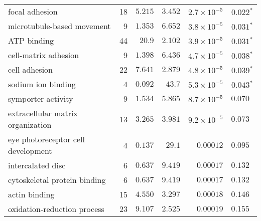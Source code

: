 \begin{longtable}{|l|r|r|r|r|r|}
                                    focal adhesion &                      18 &                $ 5.215$ &   $ 3.452$ &  $2.7\times 10^{-5}$ &              $\bm{ 0.022{^*}}$ \\
                        microtubule-based movement &                       9 &                $ 1.353$ &   $ 6.652$ &  $3.8\times 10^{-5}$ &              $\bm{ 0.031{^*}}$ \\
                                       ATP binding &                      44 &                $  20.9$ &   $ 2.102$ &  $3.9\times 10^{-5}$ &              $\bm{ 0.031{^*}}$ \\
                              cell-matrix adhesion &                       9 &                $ 1.398$ &   $ 6.436$ &  $4.7\times 10^{-5}$ &              $\bm{ 0.038{^*}}$ \\
                                     cell adhesion &                      22 &                $ 7.641$ &   $ 2.879$ &  $4.8\times 10^{-5}$ &              $\bm{ 0.039{^*}}$ \\
                                sodium ion binding &                       4 &                $ 0.092$ &   $  43.7$ &  $5.3\times 10^{-5}$ &              $\bm{ 0.043{^*}}$ \\
                                symporter activity &                       9 &                $ 1.534$ &   $ 5.865$ &  $8.7\times 10^{-5}$ &                     $ 0.070~~$ \\
                 extracellular matrix organization &                      13 &                $ 3.265$ &   $ 3.981$ &  $9.2\times 10^{-5}$ &                     $ 0.073~~$ \\
                eye photoreceptor cell development &                       4 &                $ 0.137$ &   $  29.1$ &            $0.00012$ &                     $ 0.095~~$ \\
                                 intercalated disc &                       6 &                $ 0.637$ &   $ 9.419$ &            $0.00017$ &                     $ 0.132~~$ \\
                      cytoskeletal protein binding &                       6 &                $ 0.637$ &   $ 9.419$ &            $0.00017$ &                     $ 0.132~~$ \\
                                     actin binding &                      15 &                $ 4.550$ &   $ 3.297$ &            $0.00018$ &                     $ 0.146~~$ \\
                       oxidation-reduction process &                      23 &                $ 9.107$ &   $ 2.525$ &            $0.00019$ &                     $ 0.155~~$ \\

\end{longtable}
